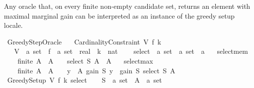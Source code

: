 \begin{isabellebody}
\begin{isamarkuptext}
Any oracle that, on every finite non-empty candidate set, returns
an element with maximal marginal gain can be interpreted as an
instance of the greedy setup locale.%
\end{isamarkuptext}\isamarkuptrue%
\isamarkupfalse%
\ Greedy{\isacharunderscore}{\kern0pt}Step{\isacharunderscore}{\kern0pt}Oracle\ {\isacharequal}{\kern0pt}\isanewline
\ \ Cardinality{\isacharunderscore}{\kern0pt}Constraint\ V\ f\ k\isanewline
\ \ \ V\ {\isacharcolon}{\kern0pt}{\isacharcolon}{\kern0pt}\ {\isachardoublequoteopen}{\isacharprime}{\kern0pt}a\ set{\isachardoublequoteclose}\ \ f\ {\isacharcolon}{\kern0pt}{\isacharcolon}{\kern0pt}\ {\isachardoublequoteopen}{\isacharprime}{\kern0pt}a\ set\ {\isasymRightarrow}\ real{\isachardoublequoteclose}\ \ k\ {\isacharcolon}{\kern0pt}{\isacharcolon}{\kern0pt}\ nat\ {\isacharplus}{\kern0pt}\isanewline
\ \ \ select\ {\isacharcolon}{\kern0pt}{\isacharcolon}{\kern0pt}\ {\isachardoublequoteopen}{\isacharprime}{\kern0pt}a\ set\ {\isasymRightarrow}\ {\isacharprime}{\kern0pt}a\ set\ {\isasymRightarrow}\ {\isacharprime}{\kern0pt}a{\isachardoublequoteclose}\isanewline
\ \ \ select{\isacharunderscore}{\kern0pt}mem{\isacharcolon}{\kern0pt}\isanewline
\ \ \ \ {\isachardoublequoteopen}finite\ A\ {\isasymLongrightarrow}\ A\ {\isasymnoteq}\ {\isacharbraceleft}{\kern0pt}{\isacharbraceright}{\kern0pt}\ {\isasymLongrightarrow}\ select\ S\ A\ {\isasymin}\ A{\isachardoublequoteclose}\isanewline
\ \ \ select{\isacharunderscore}{\kern0pt}max{\isacharcolon}{\kern0pt}\isanewline
\ \ \ \ {\isachardoublequoteopen}finite\ A\ {\isasymLongrightarrow}\ A\ {\isasymnoteq}\ {\isacharbraceleft}{\kern0pt}{\isacharbraceright}{\kern0pt}\ {\isasymLongrightarrow}\ {\isacharparenleft}{\kern0pt}{\isasymforall}y\ {\isasymin}\ A{\isachardot}{\kern0pt}\ gain\ S\ y\ {\isasymle}\ gain\ S\ {\isacharparenleft}{\kern0pt}select\ S\ A{\isacharparenright}{\kern0pt}{\isacharparenright}{\kern0pt}{\isachardoublequoteclose}\isanewline
{}\isanewline
\isanewline
{}\isamarkupfalse%
\ Greedy{\isacharunderscore}{\kern0pt}Setup\ V\ f\ k\ select\isanewline
%
\isadelimproof
%
\endisadelimproof
%
\isatagproof
{}\isamarkupfalse%
\isanewline
\ \ \isamarkupfalse%
\ S\ {\isacharcolon}{\kern0pt}{\isacharcolon}{\kern0pt}\ {\isachardoublequoteopen}{\isacharprime}{\kern0pt}a\ set{\isachardoublequoteclose}\ \ A\ {\isacharcolon}{\kern0pt}{\isacharcolon}{\kern0pt}\ {\isachardoublequoteopen}{\isacharprime}{\kern0pt}a\ set{\isachardoublequoteclose}\isanewline

\end{isabellebody}
